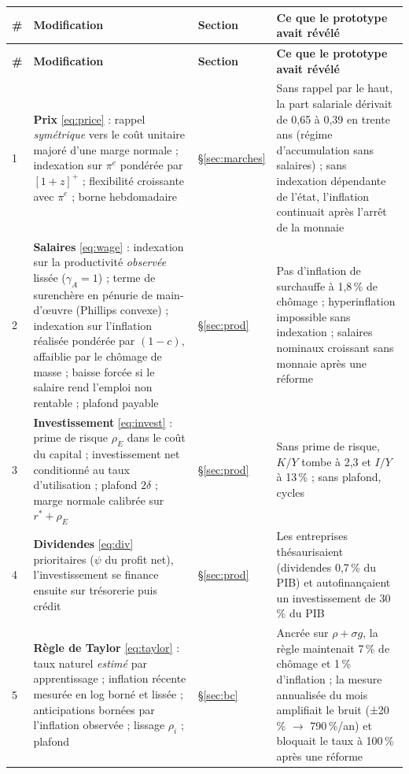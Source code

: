 \documentclass[11pt,a4paper]{article}
\newcommand{\pos}[1]{{\left[#1\right]^{+}}}
\begin{document}
\begin{center}\small
\begin{longtable}{p{0.5cm}p{6.6cm}p{2.1cm}p{5.8cm}}
\toprule
\textbf{\#} & \textbf{Modification} & \textbf{Section} & \textbf{Ce que le prototype avait révélé}\\
\midrule
\endfirsthead
\toprule
\textbf{\#} & \textbf{Modification} & \textbf{Section} & \textbf{Ce que le prototype avait révélé}\\
\midrule
\endhead
1 & \textbf{Prix} \eqref{eq:price} : rappel \emph{symétrique} vers le coût unitaire majoré d'une marge normale ; indexation sur $\pi^e$ pondérée par $\pos{1+z}$ ; flexibilité croissante avec $\pi^e$ ; borne hebdomadaire & \S\ref{sec:marches} & Sans rappel par le haut, la part salariale dérivait de 0,65 à 0,39 en trente ans (régime d'accumulation sans salaires) ; sans indexation dépendante de l'état, l'inflation continuait après l'arrêt de la monnaie\\
2 & \textbf{Salaires} \eqref{eq:wage} : indexation sur la productivité \emph{observée} lissée ($\gamma_A=1$) ; terme de surenchère en pénurie de main-d'œuvre (Phillips convexe) ; indexation sur l'inflation réalisée pondérée par $(1-c)$, affaiblie par le chômage de masse ; baisse forcée si le salaire rend l'emploi non rentable ; plafond payable & \S\ref{sec:prod} & Pas d'inflation de surchauffe à 1,8\,\% de chômage ; hyperinflation impossible sans indexation ; salaires nominaux croissant sans monnaie après une réforme\\
3 & \textbf{Investissement} \eqref{eq:invest} : prime de risque $\rho_E$ dans le coût du capital ; investissement net conditionné au taux d'utilisation ; plafond $2\delta$ ; marge normale calibrée sur $r^\ast+\rho_E$ & \S\ref{sec:prod} & Sans prime de risque, $K/Y$ tombe à 2,3 et $I/Y$ à 13\,\% ; sans plafond, cycles\\
4 & \textbf{Dividendes} \eqref{eq:div} prioritaires ($\psi$ du profit net), l'investissement se finance ensuite sur trésorerie puis crédit & \S\ref{sec:prod} & Les entreprises thésaurisaient (dividendes 0,7\,\% du PIB) et autofinançaient un investissement de 30\,\% du PIB\\
5 & \textbf{Règle de Taylor} \eqref{eq:taylor} : taux naturel \emph{estimé} par apprentissage ; inflation récente mesurée en log borné et lissée ; anticipations bornées par l'inflation observée ; lissage $\rho_i$ ; plafond & \S\ref{sec:bc} & Ancrée sur $\rho+\sigma g$, la règle maintenait 7\,\% de chômage et 1\,\% d'inflation ; la mesure annualisée du mois amplifiait le bruit (±20\,\% $\to$ 790\,\%/an) et bloquait le taux à 100\,\% après une réforme\\

\end{longtable}
\end{center}
\end{document}
